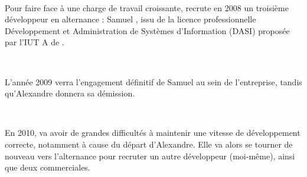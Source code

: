 ~

Pour faire face à une charge de travail croissante, \solulog{} recrute en 2008 un troisième développeur en alternance : Samuel , issu de la licence professionnelle Développement et Administration de Systèmes d'Information (DASI) proposée par l'IUT A de .

~

L'année 2009 verra l'engagement définitif de Samuel au sein de l'entreprise, tandis qu'Alexandre donnera sa démission.

~

En 2010, \solulog{} va avoir de grandes difficultés à maintenir une vitesse de développement correcte, notamment à cause du départ d'Alexandre. Elle va alors se tourner de nouveau vers l'alternance pour recruter un autre développeur (moi-même), ainsi que deux commerciales.